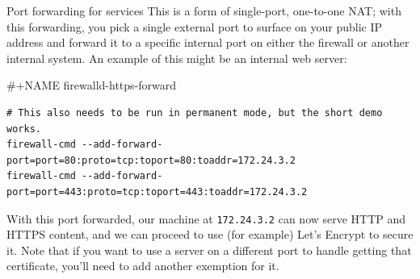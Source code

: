 \documentclass[bigger]{beamer}
\begin{document}
\begin{frame}[fragile,label={sec:orgc73d656}]{Port forwarding for services}
 This is a form of single-port, one-to-one NAT; with this forwarding, you
pick a single external port to surface on your public IP address and forward
it to a specific internal port on either the firewall or another internal
system. An example of this might be an internal web server:

\#+NAME firewalld-https-forward
\begin{verbatim}
# This also needs to be run in permanent mode, but the short demo works.
firewall-cmd --add-forward-port=port=80:proto=tcp:toport=80:toaddr=172.24.3.2
firewall-cmd --add-forward-port=port=443:proto=tcp:toport=443:toaddr=172.24.3.2
\end{verbatim}

With this port forwarded, our machine at \texttt{172.24.3.2} can now serve HTTP and
HTTPS content, and we can proceed to use (for example) Let's Encrypt to
secure it. Note that if you want to use a server on a different port to handle
getting that certificate, you'll need to add another exemption for it.
\end{frame}
\end{document}
